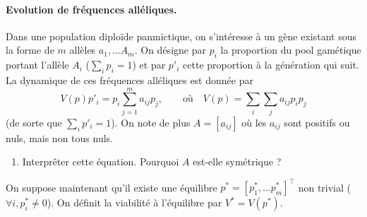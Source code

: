 \paragraph{Evolution de fréquences alléliques.}
Dans une population diploïde panmictique, on s’intéresse à un gène existant sous la forme de
$m$ allèles $a_1, \dots A_m$. On désigne par $p_i$ la proportion du pool gamétique portant l’allèle $A_i$ ($\sum_i p_i = 1$) et par $p'_i$ cette proportion à la génération qui suit. La dynamique de ces fréquences alléliques est donnée par
\begin{equation} \label{eq:dynFreqModele}
  V(p) p'_i = p_i \sum_{j=1}^m a_{ij} p_j, 
  \qquad \text{où} \quad
  V(p) = \sum_i \sum_j a_{ij} p_i p_j
\end{equation}
(de sorte que $\sum_i p'_i = 1$).
On note de plus $A = [a_{ij}]$ où les $a_{ij}$ sont positifs ou nuls, mais non tous nuls.

\begin{enumerate}
  \item Interprêter cette équation. Pourquoi $A$ est-elle symétrique ?
\end{enumerate}

On suppose maintenant qu'il existe une équilibre $p^* = [p^*_1, \dots p^*_m]^\top$ non trivial ($\forall i, p^*_i \neq 0$). On définit la viabilité à l'équilibre par $V^* = V(p^*)$.

